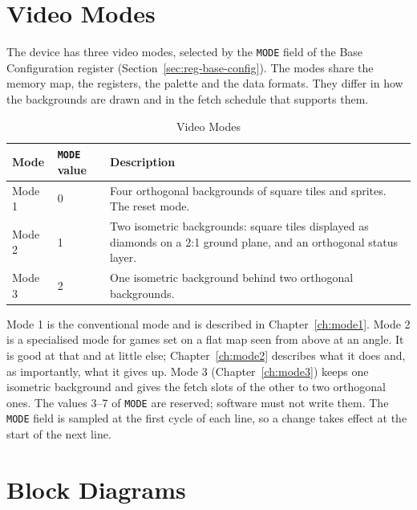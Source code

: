 \section{Video Modes}
\label{sec:video-modes}

The device has three video modes, selected by the \texttt{MODE} field of the Base Configuration register
(Section~\ref{sec:reg-base-config}). The modes share the memory map, the registers, the palette and the data formats.
They differ in how the backgrounds are drawn and in the fetch schedule that supports them.

\begin{table}[H]
	\centering
	\begin{tabular}{llp{7.5cm}}
		\toprule
		\textbf{Mode} & \textbf{\texttt{MODE} value} & \textbf{Description}                                                                                                 \\
		\midrule
		Mode 1        & 0                            & Four orthogonal backgrounds of square tiles and sprites. The reset mode.                                             \\
		Mode 2        & 1                            & Two isometric backgrounds: square tiles displayed as diamonds on a 2:1 ground plane, and an orthogonal status layer. \\
		Mode 3        & 2                            & One isometric background behind two orthogonal backgrounds.                                                          \\
		\bottomrule
	\end{tabular}
	\caption{Video Modes}
	\label{tab:video-modes}
\end{table}

Mode 1 is the conventional mode and is described in Chapter~\ref{ch:mode1}. Mode 2 is a specialised mode for games set
on a flat map seen from above at an angle. It is good at that and at little else; Chapter~\ref{ch:mode2} describes what
it does and, as importantly, what it gives up. Mode 3 (Chapter~\ref{ch:mode3}) keeps one isometric background and gives
the fetch slots of the other to two orthogonal ones. The values 3--7 of \texttt{MODE} are reserved; software must not
write them. The \texttt{MODE} field is sampled at the first cycle of each line, so a change takes effect at the start
of the next line.

\section{Block Diagrams}
\label{sec:block-diagrams}

